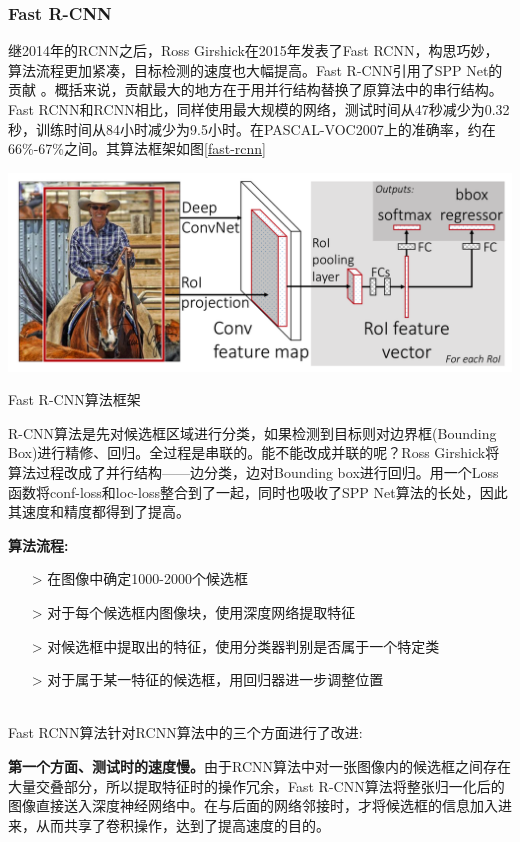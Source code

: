 \subsubsection{Fast R-CNN}
继2014年的RCNN之后，Ross Girshick在2015年发表了Fast RCNN\cite{fastrcnn}，构思巧妙，算法流程更加紧凑，目标检测的速度也大幅提高。Fast R-CNN引用了SPP Net的贡献 。概括来说，贡献最大的地方在于用并行结构替换了原算法中的串行结构。Fast RCNN和RCNN相比，同样使用最大规模的网络，测试时间从47秒减少为0.32秒，训练时间从84小时减少为9.5小时。在PASCAL-VOC2007上的准确率，约在66\%-67\%之间。其算法框架如图\ref{fast-rcnn}
\begin{uscfigure}
	\includegraphics[width=\textwidth]{./Pictures/fast_rcnn.png}	
	\caption{Fast R-CNN算法框架}	
	\label{fast-rcnn}
\end{uscfigure}
R-CNN算法是先对候选框区域进行分类，如果检测到目标则对边界框(Bounding Box)进行精修、回归。全过程是串联的。能不能改成并联的呢？Ross Girshick将算法过程改成了并行结构——边分类，边对Bounding box进行回归。用一个Loss函数将conf-loss和loc-loss整合到了一起，同时也吸收了SPP Net算法的长处，因此其速度和精度都得到了提高。

\textbf{算法流程:}

\line
\begin{itemize}
	\setlength{\itemsep}{0pt}
	\setlength{\parsep}{0pt}
	\setlength{\parskip}{0pt}
	\item[>] 在图像中确定1000-2000个候选框 
	\item[>] 对于每个候选框内图像块，使用深度网络提取特征
	\item[>] 对候选框中提取出的特征，使用分类器判别是否属于一个特定类
	\item[>] 对于属于某一特征的候选框，用回归器进一步调整位置
\end{itemize}
\line\\
Fast RCNN算法针对RCNN算法中的三个方面进行了改进:

\textbf{第一个方面、测试时的速度慢。}由于RCNN算法中对一张图像内的候选框之间存在大量交叠部分，所以提取特征时的操作冗余，Fast R-CNN算法将整张归一化后的图像直接送入深度神经网络中。在与后面的网络邻接时，才将候选框的信息加入进来，从而共享了卷积操作，达到了提高速度的目的。

